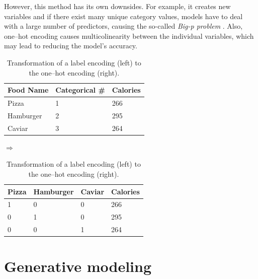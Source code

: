  However, this method has its own downsides. For example, it creates new variables and if there exist many unique category values, models have to deal with a large number of predictors, causing the so-called \emph{Big-p problem} \cite{Bigp}. Also, one--hot encoding causes multicolinearity between the individual variables, which may lead to reducing the model's accuracy. 
 \begin{table}[h]
 \centering
 	\begin{tabular}{|l|l|l|}
 		\hline
 		Food Name & Categorical \# & Calories \\ \hline
 		Pizza     & 1              & 266      \\ \hline
 		Hamburger & 2              & 295      \\ \hline
 		Caviar    & 3              & 264      \\ \hline
 	\end{tabular}
 	\quad $\Rightarrow$ \quad
	\begin{tabular}{|l|l|l|l|}
		\hline
		Pizza & Hamburger & Caviar & Calories \\ \hline
		1     & 0         & 0      & 266      \\ \hline
		0     & 1         & 0      & 295      \\ \hline
		0     & 0         & 1      & 264      \\ \hline
	\end{tabular}
	\caption{Transformation of a label encoding (left) to the one--hot encoding (right).}
	\label{tab:OHE}
 \end{table}
\section{Generative modeling}



